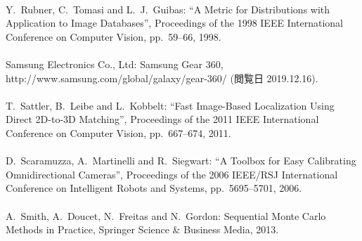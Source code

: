 \begin{mythebibliography}{}
\leavevmode \\Y.~Rubner, C.~Tomasi and L.~J.~Guibas:
\newblock ``A Metric for Distributions with Application to Image Databases'',
\newblock Proceedings of the 1998 IEEE International Conference on Computer Vision, pp.~59--66, 1998.
\\


\leavevmode \\Samsung Electronics Co., Ltd:
\newblock Samsung Gear 360,\\
\newblock http://www.samsung.com/global/galaxy/gear-360/ (閲覧日 2019.12.16).
\\

\leavevmode \\T.~Sattler, B.~Leibe and L.~Kobbelt:
\newblock ``Fast Image-Based Localization Using Direct 2D-to-3D Matching'',
\newblock Proceedings of the 2011 IEEE International Conference on Computer Vision, pp.~667--674, 2011.
\\

\leavevmode \\D.~Scaramuzza, A.~Martinelli and R.~Siegwart:
\newblock ``A Toolbox for Easy Calibrating Omnidirectional Cameras'',
\newblock Proceedings of the 2006 IEEE/RSJ International Conference on Intelligent Robots and Systems, pp.~5695--5701, 2006.
\\


\leavevmode \\A.~Smith, A.~Doucet, N.~Freitas and N.~Gordon:
\newblock Sequential Monte Carlo Methods in Practice,
\newblock Springer Science \& Business Media, 2013.
\\


\end{mythebibliography}
